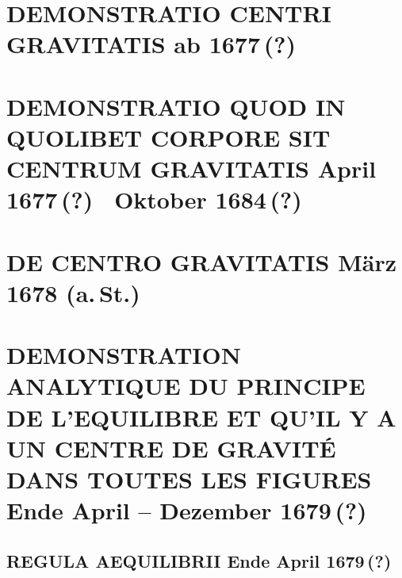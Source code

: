 \documentclass[%
fontsize=10pt,
]{scrbook}
\DeclareRobustCommand{\bracks}[1]{%
\textup{\lbrack}#1\textup{\rbrack}}
\begin{document}
\chapter[tocentry={Demonstratio centri gravitatis
\enskip \bracks{ab 1677\,(?)}
},
head={Demonstratio centri gravitatis}]
{\MakeUppercase{Demonstratio centri gravitatis}
\newline \bracks{ab 1677\,(?)}
}
\label{60066}






\chapter[tocentry={Demonstratio quod in quolibet corpore sit Centrum Gravitatis
\enskip \bracks{April 1677\,(?) \textendash\ Oktober 1684\,(?)}},
head={Demonstratio quod in quolibet corpore sit Centrum Gravitatis}]
{\MakeUppercase{Demonstratio quod in quolibet corpore sit Centrum Gravitatis}
\newline \bracks{April 1677\,(?) \textendash\ Oktober 1684\,(?)}}
\label{41137}





\chapter[tocentry={De centro gravitatis
\enskip März 1678 (a.\,St.)},
head={De centro gravitatis}]
{\MakeUppercase{De centro gravitatis}
\newline März 1678 (a.\,St.)}

\label{60279}





\chapter[tocentry={Demonstration analytique du principe de l'equilibre et qu'il y a un centre de gravité dans toutes les figures
\enskip \bracks{Ende April -- Dezember 1679\,(?)}},
head={Demonstration analytique du principe de l'equilibre}]%
{\MakeUppercase{Demonstration analytique du principe de l'equilibre et qu'il y a un centre de gravité dans toutes les figures}
\newline \bracks{Ende April -- Dezember 1679\,(?)}}
\label{intro_demonstration-equilibre}

\section[tocentry={Regula aequilibrii
\enskip \bracks{Ende April 1679\,(?)}},
head={Regula aequilibrii}]
{\MakeUppercase{Regula aequilibrii}
\newline \bracks{Ende April 1679\,(?)}}
\label{57032}

\end{document}
